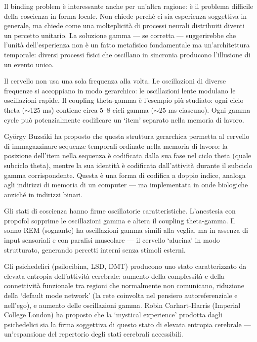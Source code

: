 \documentclass[12pt,a4paper,openany]{book}
\newcommand{\sezione}[1]{\vspace{1.2em}{\large\bfseries #1}\vspace{0.5em}\par}
\begin{document}
Il binding problem è interessante anche per un'altra ragione: è il problema difficile della coscienza in forma locale. Non chiede perché ci sia esperienza soggettiva in generale, ma chiede come una molteplicità di processi neurali distribuiti diventi un percetto unitario. La soluzione gamma — se corretta — suggerirebbe che l'unità dell'esperienza non è un fatto metafisico fondamentale ma un'architettura temporale: diversi processi fisici che oscillano in sincronia producono l'illusione di un evento unico.

\sezione{Il coupling theta-gamma e la struttura gerarchica della memoria}

Il cervello non usa una sola frequenza alla volta. Le oscillazioni di diverse frequenze si accoppiano in modo gerarchico: le oscillazioni lente modulano le oscillazioni rapide. Il coupling theta-gamma è l'esempio più studiato: ogni ciclo theta ($\sim$125 ms) contiene circa 5--8 cicli gamma ($\sim$25 ms ciascuno). Ogni gamma cycle può potenzialmente codificare un `item' separato nella memoria di lavoro.

György Buzsáki ha proposto che questa struttura gerarchica permetta al cervello di immagazzinare sequenze temporali ordinate nella memoria di lavoro: la posizione dell'item nella sequenza è codificata dalla sua fase nel ciclo theta (quale subciclo theta), mentre la sua identità è codificata dall'attività durante il subciclo gamma corrispondente. Questa è una forma di codifica a doppio indice, analoga agli indirizzi di memoria di un computer — ma implementata in onde biologiche anziché in indirizzi binari.

\sezione{Ritmi cerebrali e stati alterati di coscienza}

Gli stati di coscienza hanno firme oscillatorie caratteristiche. L'anestesia con propofol sopprime le oscillazioni gamma e altera il coupling theta-gamma. Il sonno REM (sognante) ha oscillazioni gamma simili alla veglia, ma in assenza di input sensoriali e con paralisi muscolare — il cervello `alucina' in modo strutturato, generando percetti interni senza stimoli esterni.

Gli psichedelici (psilocibina, LSD, DMT) producono uno stato caratterizzato da elevata entropia dell'attività cerebrale: aumento della complessità e della connettività funzionale tra regioni che normalmente non comunicano, riduzione della `default mode network' (la rete coinvolta nel pensiero autoreferenziale e nell'ego), e aumento delle oscillazioni gamma. Robin Carhart-Harris (Imperial College London) ha proposto che la `mystical experience' prodotta dagli psichedelici sia la firma soggettiva di questo stato di elevata entropia cerebrale — un'espansione del repertorio degli stati cerebrali accessibili.
\end{document}
